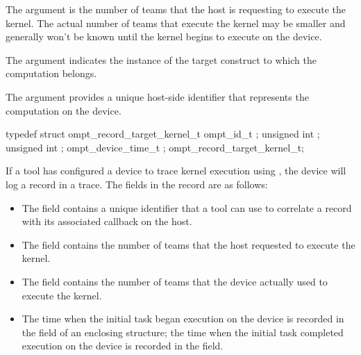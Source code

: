 The argument  is the number of teams that the host is requesting to
execute the kernel. The actual number of teams that execute the kernel may be smaller and generally won't be
known until the kernel begins to execute on the device.

\constraints

The argument  indicates the instance of the
target construct to which the computation belongs.

The argument  provides a unique host-side
identifier that represents the computation on the device.

\record

\begin{ccppspecific}
\begin{omptRecord}
typedef struct ompt_record_target_kernel_t {
  ompt_id_t ;
  unsigned int ;
  unsigned int ;
  ompt_device_time_t ;
} ompt_record_target_kernel_t;
\end{omptRecord}
\end{ccppspecific}



If a tool has configured a device to trace kernel execution using ,
the device will log a  record in a trace. The fields in the record
are as follows:

\begin{itemize}
\item The  field contains a unique identifier that a tool can use to correlate a
 record with its associated  callback
on the host.

\item The  field contains the number of teams that the host requested to execute the kernel.

\item The  field contains the number of teams that the device actually used to execute the kernel.

\item The time when the initial task began execution on the device is recorded in the  field of an enclosing
 structure; the time when the initial task completed execution on the device is recorded in the  field.
\end{itemize}

